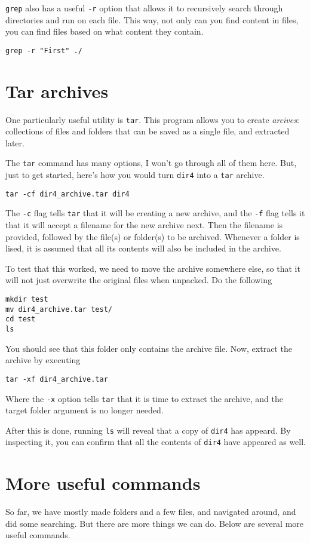 \documentclass[aps,showpacs,prd,notitlepage,preprintnumbers,amsmath,amssymb,letterpaper]{revtex4}
\begin{document}
\verb|grep| also has a useful \verb|-r| option that allows it to recursively search through directories and run on each file.
This way, not only can you find content in files, you can find files based on what content they contain.

\begin{verbatim}
grep -r "First" ./
\end{verbatim}

\section{Tar archives}
One particularly useful utility is \verb|tar|.
This program allows you to create \textit{arcives}: collections of files and folders that can be saved as a single file, and extracted later.

The \verb|tar| command has many options, I won't go through all of them here.
But, just to get started, here's how you would turn \verb|dir4| into a \verb|tar| archive.
\begin{verbatim}
tar -cf dir4_archive.tar dir4
\end{verbatim}
The \verb|-c| flag tells \verb|tar| that it will be creating a new archive, and the \verb|-f| flag tells it that it will accept a filename for the new archive next.
Then the filename is provided, followed by the file(s) or folder(s) to be archived.
Whenever a folder is lised, it is assumed that all its contents will also be included in the archive.

To test that this worked, we need to move the archive somewhere else, so that it will not just overwrite the original files when unpacked.
Do the following
\begin{verbatim}
mkdir test
mv dir4_archive.tar test/
cd test
ls
\end{verbatim}

You should see that this folder only contains the archive file.
Now, extract the archive by executing

\begin{verbatim}
tar -xf dir4_archive.tar
\end{verbatim}
Where the \verb|-x| option tells \verb|tar| that it is time to extract the archive, and the target folder argument is no longer needed.

After this is done, running \verb|ls| will reveal that a copy of \verb|dir4| has appeard.
By inspecting it, you can confirm that all the contents of \verb|dir4| have appeared as well.

\section{More useful commands}
So far, we have mostly made folders and a few files, and navigated around, and did some searching.
But there are more things we can do.
Below are several more useful commands.
\end{document}

